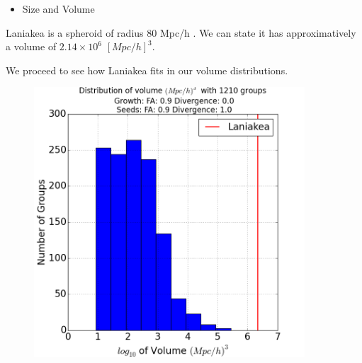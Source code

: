 \documentclass[12pt]{article}
\begin{document}
\begin{itemize}
\item Size and Volume
\end{itemize}
\begin{par}
Laniakea is a spheroid of radius 80 Mpc/h \cite{tully_laniakea_2014}. We can state it has approximatively a volume of $2.14  \times 10^6$ $\left[ Mpc/h \right]^3$.\\
\end{par}
\begin{par}
We proceed to see how Laniakea fits in our volume distributions.
\end{par}

\begin{figure}[ht]
\centering
\begin{minipage}{.5\textwidth}
  \centering
  \includegraphics[width=0.9\textwidth]{groups/volumeplots/volumes_distr_Mpc_laniakea_09_Trace_10_search_FA_09_Trace_00.png} %
\end{minipage}%
\begin{minipage}{.5\textwidth}
  \centering

\end{minipage}
\end{figure}
\end{document}
